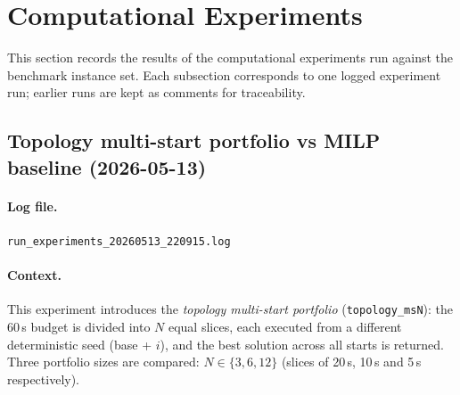 \section{Computational Experiments}
\label{sec:experiments}

This section records the results of the computational experiments run against
the benchmark instance set.  Each subsection corresponds to one logged
experiment run; earlier runs are kept as comments for traceability.

\subsection{Topology multi-start portfolio vs MILP baseline (2026-05-13)}
\label{exp:multistart-20260513}


\paragraph{Log file.}
\texttt{run\_experiments\_20260513\_220915.log}

\paragraph{Context.}
This experiment introduces the \emph{topology multi-start portfolio}
(\texttt{topology\_msN}): the 60\,s budget is divided into $N$ equal slices,
each executed from a different deterministic seed (base + $i$), and the best
solution across all starts is returned.  Three portfolio sizes are compared:
$N \in \{3, 6, 12\}$ (slices of 20\,s, 10\,s and 5\,s respectively).


